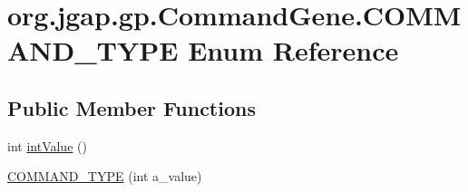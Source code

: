 \hypertarget{enumorg_1_1jgap_1_1gp_1_1_command_gene_1_1_c_o_m_m_a_n_d___t_y_p_e}{\section{org.\-jgap.\-gp.\-Command\-Gene.\-C\-O\-M\-M\-A\-N\-D\-\_\-\-T\-Y\-P\-E Enum Reference}
\label{enumorg_1_1jgap_1_1gp_1_1_command_gene_1_1_c_o_m_m_a_n_d___t_y_p_e}
}
\subsection*{Public Member Functions}
\begin{DoxyCompactItemize}
\item 
int \hyperlink{enumorg_1_1jgap_1_1gp_1_1_command_gene_1_1_c_o_m_m_a_n_d___t_y_p_e_a38c699d20c74ab638ae8c99e7214d348}{int\-Value} ()
\item 
\hyperlink{enumorg_1_1jgap_1_1gp_1_1_command_gene_1_1_c_o_m_m_a_n_d___t_y_p_e_a6c997a39767cf35d081547be321c46ff}{C\-O\-M\-M\-A\-N\-D\-\_\-\-T\-Y\-P\-E} (int a\-\_\-value)
\end{DoxyCompactItemize}
